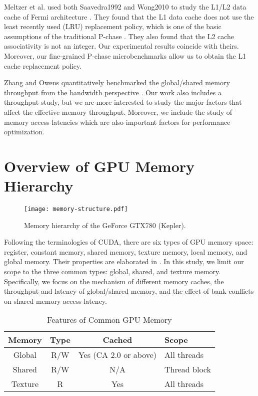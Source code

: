 \documentclass[10pt,journal,compsoc]{IEEEtran}
\theoremstyle{definition}
\begin{document}
Meltzer et al. used both Saavedra1992 and Wong2010 to study the  L1/L2 data cache of Fermi architecture \cite{meltzer2013micro}. They found that the L1 data cache does not use the least recently used (LRU) replacement policy, which is one of the basic assumptions of the traditional P-chase \cite{wong2010demystifying}. They also found that the L2 cache associativity is not an integer. Our experimental results coincide with theirs. Moreover, our fine-grained P-chase microbenchmarks allow us to obtain the L1 cache replacement policy.

Zhang and Owens quantitatively benchmarked the global/shared memory throughput from the bandwidth perspective \cite{zhang2011quantitative}. Our work also includes a throughput study, but we are more interested to study the major factors that affect the effective memory throughput. Moreover, we include the study of memory access latencies which are also important factors for performance optimization.






\section{Overview of GPU Memory Hierarchy}

\begin{figure}
\centering
\texttt{[image: memory-structure.pdf]}
\caption{Memory hierarchy of the GeForce GTX780 (Kepler).}
\label{fig:KeplerBlock}
\end{figure}


Following the terminologies of CUDA, there are six types of GPU memory space: register, constant memory, shared memory, texture memory, local memory, and global memory. Their properties are elaborated in \cite{cudacprogrammingguide,cudabestguide}. In this study, we limit our scope to the three common types: global, shared, and texture memory. Specifically, we focus on the mechanism of different memory caches, the throughput and latency of global/shared memory, and the effect of bank conflicts on shared memory access latency.

\begin{table}
\renewcommand{\arraystretch}{1.1}
\centering
\caption {Features of Common GPU Memory}
\label{tab:memFeatures}
\begin{tabular}
 {|c|c|c|l|}  \hline  Memory & Type & Cached & Scope \\ \hline
  Global & R/W & Yes (CA 2.0 or above) & All threads \\
  \hline
  Shared & R/W & N/A & Thread block\\
  \hline
  Texture &R &Yes & All threads \\
  \hline
\end{tabular}
\end{table}
\end{document}
